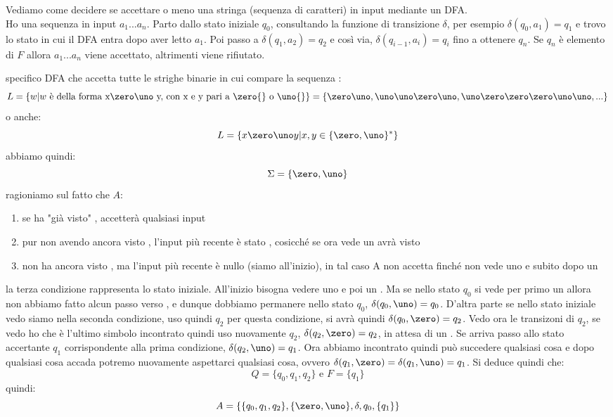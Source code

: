 Vediamo come decidere se accettare o meno una stringa (sequenza di caratteri) in input mediante un DFA.\\
Ho una sequenza in input $a_1...a_n$. Parto dallo stato iniziale $q_0$, consultando la funzione di transizione $\delta$, per esempio  $\delta(q_0,a_1)=q_1$ e trovo lo stato in cui il DFA entra dopo aver letto $a_1$. Poi passo a $\delta(q_1,a_2)=q_2$ e così via, $\delta(q_{i-1},a_i)=q_i$ fino a ottenere $q_n$. Se $q_n$ è elemento di $F$ allora $a_1...a_n$ viene accettato, altrimenti viene rifiutato.
\begin{example}
	specifico DFA che accetta tutte le strighe binarie in cui compare la sequenza \zero\uno:
	$$L=\{w|w \mbox{ è della forma x\zero\uno y, con x e y pari a \zero{} o \uno{}} \}=\{\zero\uno,\uno\uno\zero\uno,\uno\zero\zero\zero\uno\uno,...\}$$
	o anche:
	$$L=\{x\zero\uno y| x,y\in\{\zero,\uno\}^* \}$$
	abbiamo quindi:
	$$\Sigma=\{\zero,\uno\}$$
	ragioniamo sul fatto che $A$:
	\begin{enumerate}
		\item se ha "già visto" \zero\uno, accetterà qualsiasi input
		\item pur non avendo ancora visto \zero\uno, l'input più recente è stato \zero{}, cosicché se ora vede un \uno{} avrà visto \zero\uno
		\item non ha ancora visto \zero\uno, ma l'input più recente è nullo (siamo all'inizio), in tal caso A non accetta finché non vede
		      uno \zero{} e subito dopo un \uno{}
	\end{enumerate}
	la terza condizione rappresenta lo stato iniziale. All'inizio bisogna vedere uno \zero{} e poi un \uno{}. Ma se nello stato $q_0$ si vede per primo un \uno{} allora non abbiamo fatto alcun passo verso \zero\uno, e dunque dobbiamo permanere nello stato $q_0$, $\delta(q_0,\uno)=q_0$. D'altra parte se nello stato iniziale vedo \zero{} siamo nella seconda condizione, uso quindi $q_2$ per questa condizione, si avrà quindi $\delta(q_0,\zero)=q_2$. Vedo ora le transizoni di $q_2$, se vedo \zero{} ho che \zero{} è l'ultimo simbolo incontrato quindi uso nuovamente $q_2$, $\delta(q_2,\zero)=q_2$, in attesa di un \uno{}. Se arriva \uno{} passo allo stato accertante $q_1$ corrispondente alla prima condizione, $\delta(q_2,\uno)=q_1$. Ora abbiamo incontrato \zero\uno quindi può succedere qualsiasi cosa e dopo qualsiasi cosa accada potremo nuovamente aspettarci qualsiasi cosa, ovvero $\delta(q_1,\zero)=\delta(q_1,\uno)=q_1$. Si deduce quindi che:
	$$Q=\{q_0,q_1,q_2\} \mbox{ e } F=\{q_1\}$$
	quindi:
	$$A=\{\{q_0,q_1,q_2\} ,\{\zero,\uno\}, \delta, q_0, \{q_1\} \}$$

\end{example}

